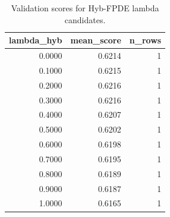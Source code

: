 \begin{table}[t]
\caption{Validation scores for Hyb-FPDE lambda candidates.}
\label{tab:lambda_distribution_computed}
\centering
\begin{tabular}{rrr}
\toprule
lambda\_hyb & mean\_score & n\_rows \\
\midrule
0.0000 & 0.6214 & 1 \\
0.1000 & 0.6215 & 1 \\
0.2000 & 0.6216 & 1 \\
0.3000 & 0.6216 & 1 \\
0.4000 & 0.6207 & 1 \\
0.5000 & 0.6202 & 1 \\
0.6000 & 0.6198 & 1 \\
0.7000 & 0.6195 & 1 \\
0.8000 & 0.6189 & 1 \\
0.9000 & 0.6187 & 1 \\
1.0000 & 0.6165 & 1 \\
\bottomrule
\end{tabular}

\end{table}
